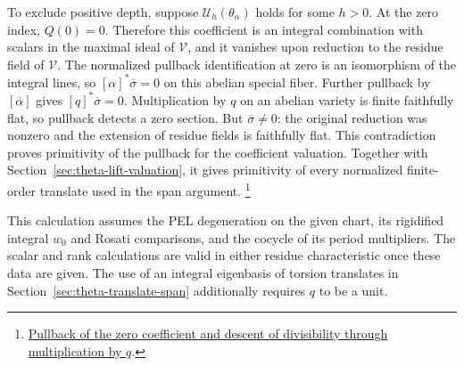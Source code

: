 To exclude positive depth, suppose \(\mathcal U_h(\theta_\alpha)\)
holds for some \(h>0\). At the zero index, \(Q(0)=0\). Therefore
this coefficient is an integral combination with scalars in the
maximal ideal of \(\mathcal V\), and it vanishes upon reduction
to the residue field of \(\mathcal V\). The normalized pullback
identification at zero is an isomorphism of the integral lines,
so \([\alpha]^*\overline\sigma=0\) on this abelian special fiber.
Further pullback by \([\overline\alpha]\) gives
\([q]^*\overline\sigma=0\). Multiplication by \(q\) on an abelian
variety is finite faithfully flat, so pullback detects a zero
section. But \(\overline\sigma\ne0\): the original reduction was
nonzero and the extension of residue fields is faithfully flat.
This contradiction proves primitivity of the pullback for the
coefficient valuation. Together with
Section~\ref{sec:theta-lift-valuation}, it gives primitivity of
every normalized finite-order translate used in the span argument.
\footnote{\href{https://github.com/ChristianKudeba/alpoge-rh-verification/blob/alpoge-source-7cbf7a0c/src/ReciprocityTheory/ReductiveGroups/ArithmeticGeometry/FirstCohomology/LevelFrameOfLaws.lean}{Pullback of the zero coefficient and descent of divisibility through multiplication by \(q\)}.}

This calculation assumes the PEL degeneration on the given chart,
its rigidified integral \(w_0\) and Rosati comparisons, and the
cocycle of its period multipliers. The scalar and rank calculations
are valid in either residue characteristic once these data are
given. The use of an integral eigenbasis of torsion translates in
Section~\ref{sec:theta-translate-span} additionally requires
\(q\) to be a unit.
